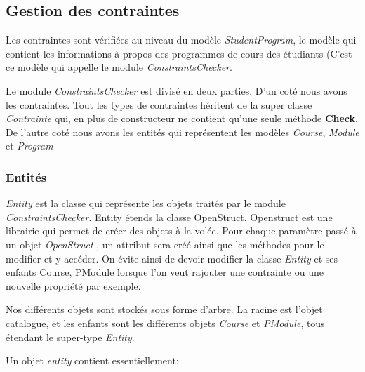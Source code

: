 \subsection{Gestion des contraintes}
\label{constraint_mgmt}
Les contraintes sont vérifiées au niveau du modèle \textit{StudentProgram}, le modèle qui contient les informations à propos des programmes de cours des étudiants (C'est ce modèle qui appelle le module \textit{ConstraintsChecker}. 

Le module \textit{ConstraintsChecker} est divisé en deux parties. D'un coté nous avons les contraintes. Tout les types de contraintes héritent de la super classe \textit{Contrainte} qui, en plus de constructeur ne contient qu'une seule méthode \textbf{Check}. De l'autre coté nous avons les entités qui représentent les modèles \textit{Course}, \textit{Module} et \textit{Program}

\subsubsection{Entités}
\textit{Entity} est la classe qui représente les objets traités par le module \textit{ConstraintsChecker}. Entity étends la classe OpenStruct. Openstruct est une librairie qui permet de créer des objets à la volée. Pour chaque paramètre passé à un objet \textit{OpenStruct} \cite{OpenStruct}, un attribut sera créé ainsi que les méthodes pour le modifier et y accéder. On évite ainsi de devoir modifier la classe \textit{Entity} et ses enfants {Course, PModule} lorsque l'on veut rajouter une contrainte ou une nouvelle propriété par exemple.

Nos différents objets sont stockés sous forme d'arbre. La racine est l'objet catalogue, et les enfants sont les différents objets \textit{Course} et \textit{PModule}, tous étendant le super-type \textit{Entity}.

Un objet \textit{entity} contient essentiellement;

